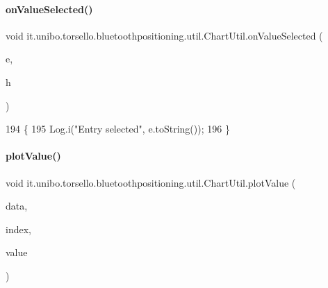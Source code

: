 \paragraph{\texorpdfstring{on\+Value\+Selected()}{onValueSelected()}}
{\footnotesize\ttfamily void it.\+unibo.\+torsello.\+bluetoothpositioning.\+util.\+Chart\+Util.\+on\+Value\+Selected (\begin{DoxyParamCaption}\item[{Entry}]{e,  }\item[{Highlight}]{h }\end{DoxyParamCaption})}


\begin{DoxyCode}
194                                                       \{
195         Log.i(\textcolor{stringliteral}{"Entry selected"}, e.toString());
196     \}
\end{DoxyCode}
\hypertarget{classit_1_1unibo_1_1torsello_1_1bluetoothpositioning_1_1util_1_1ChartUtil_a86398d4aca978fbfc10c71039191635e_a86398d4aca978fbfc10c71039191635e}{}\label{classit_1_1unibo_1_1torsello_1_1bluetoothpositioning_1_1util_1_1ChartUtil_a86398d4aca978fbfc10c71039191635e_a86398d4aca978fbfc10c71039191635e} 
\paragraph{\texorpdfstring{plot\+Value()}{plotValue()}}
{\footnotesize\ttfamily void it.\+unibo.\+torsello.\+bluetoothpositioning.\+util.\+Chart\+Util.\+plot\+Value (\begin{DoxyParamCaption}\item[{Line\+Data}]{data,  }\item[{int}]{index,  }\item[{Double}]{value }\end{DoxyParamCaption})\hspace{0.3cm}{\ttfamily [private]}}



